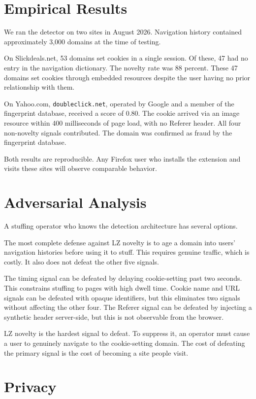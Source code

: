 \documentclass[10pt,twocolumn,letterpaper]{article}
\begin{document}
\section{Empirical Results}

We ran the detector on two sites in August 2026. Navigation history
contained approximately 3,000 domains at the time of testing.

On Slickdeals.net, 53 domains set cookies in a single session. Of these,
47 had no entry in the navigation dictionary. The novelty rate was 88
percent. These 47 domains set cookies through embedded resources despite
the user having no prior relationship with them.

On Yahoo.com, \texttt{doubleclick.net}, operated by Google and a member
of the fingerprint database, received a score of 0.80. The cookie arrived
via an image resource within 400 milliseconds of page load, with no Referer
header. All four non-novelty signals contributed. The domain was confirmed
as fraud by the fingerprint database.

Both results are reproducible. Any Firefox user who installs the extension
and visits these sites will observe comparable behavior.

\section{Adversarial Analysis}

A stuffing operator who knows the detection architecture has several options.

The most complete defense against LZ novelty is to age a domain into users'
navigation histories before using it to stuff. This requires genuine traffic,
which is costly. It also does not defeat the other five signals.

The timing signal can be defeated by delaying cookie-setting past two
seconds. This constrains stuffing to pages with high dwell time. Cookie
name and URL signals can be defeated with opaque identifiers, but this
eliminates two signals without affecting the other four. The Referer signal
can be defeated by injecting a synthetic header server-side, but this is not
observable from the browser.

LZ novelty is the hardest signal to defeat. To suppress it, an operator
must cause a user to genuinely navigate to the cookie-setting domain. The
cost of defeating the primary signal is the cost of becoming a site people
visit.

\section{Privacy}
\end{document}
